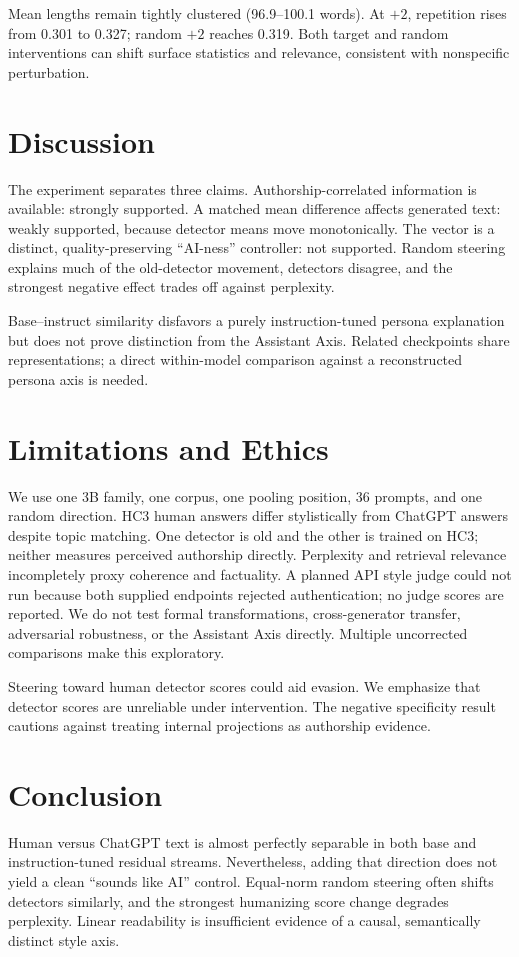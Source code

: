 \documentclass[10pt,twocolumn]{article}
\begin{document}
Mean lengths remain tightly clustered (96.9--100.1 words). At $+2$, repetition rises from 0.301 to 0.327; random $+2$ reaches 0.319. Both target and random interventions can shift surface statistics and relevance, consistent with nonspecific perturbation.

\section{Discussion}
The experiment separates three claims. Authorship-correlated information is available: strongly supported. A matched mean difference affects generated text: weakly supported, because detector means move monotonically. The vector is a distinct, quality-preserving ``AI-ness'' controller: not supported. Random steering explains much of the old-detector movement, detectors disagree, and the strongest negative effect trades off against perplexity.

Base--instruct similarity disfavors a purely instruction-tuned persona explanation but does not prove distinction from the Assistant Axis. Related checkpoints share representations; a direct within-model comparison against a reconstructed persona axis is needed.

\section{Limitations and Ethics}
We use one 3B family, one corpus, one pooling position, 36 prompts, and one random direction. HC3 human answers differ stylistically from ChatGPT answers despite topic matching. One detector is old and the other is trained on HC3; neither measures perceived authorship directly. Perplexity and retrieval relevance incompletely proxy coherence and factuality. A planned API style judge could not run because both supplied endpoints rejected authentication; no judge scores are reported. We do not test formal transformations, cross-generator transfer, adversarial robustness, or the Assistant Axis directly. Multiple uncorrected comparisons make this exploratory.

Steering toward human detector scores could aid evasion. We emphasize that detector scores are unreliable under intervention. The negative specificity result cautions against treating internal projections as authorship evidence.

\section{Conclusion}
Human versus ChatGPT text is almost perfectly separable in both base and instruction-tuned residual streams. Nevertheless, adding that direction does not yield a clean ``sounds like AI'' control. Equal-norm random steering often shifts detectors similarly, and the strongest humanizing score change degrades perplexity. Linear readability is insufficient evidence of a causal, semantically distinct style axis.


\end{document}
